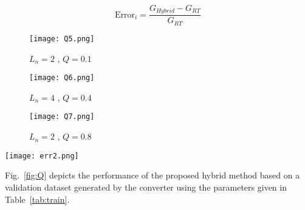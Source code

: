 \documentclass{article} %
\begin{document}
\begin{equation}
\text{Error}_{i} = \dfrac{G_{Hybrid} - G_{RT}}{G_{RT}}
\label{eq:err}
\end{equation}

\begin{figure*}[ht]
\centering
\begin{subfigure}{0.35\textwidth}
  \centering
  \texttt{[image: Q5.png]}
  \caption{$L_{n}=2$ , $Q=0.1$}
  \label{fig:sub1}
\end{subfigure}
\begin{subfigure}{0.35\textwidth}
  \centering
  \texttt{[image: Q6.png]}
  \caption{$L_{n}=4$ , $Q=0.4$}
  \label{fig:sub2}
\end{subfigure}
\begin{subfigure}{0.35\textwidth}
  \centering
  \texttt{[image: Q7.png]}
  \caption{$L_{n}=2$ , $Q=0.8$}
  \label{fig:sub3}
\end{subfigure}
\caption{Comparison between FHA, Proposed Hybrid Method, and Real-Time Simulator}
\label{fig:Q}
\end{figure*}

\begin{figure*}[hb]
\centering
\texttt{[image: err2.png]}
\caption{Error between the results from the proposed hybrid model and real-time simulator results}
\label{fig:err}
\end{figure*}

Fig.~\ref{fig:Q} depicts the performance of the proposed hybrid method based on a validation dataset generated by the converter using the parameters given in Table~\ref{tab:train}.

\begin{table}[h]
\caption{Parameters of the Real-Time-Simulation Converter Used for Train and Validation Data Sets}
\label{tab:train}
\centering
{}
\end{table}
\end{document}
